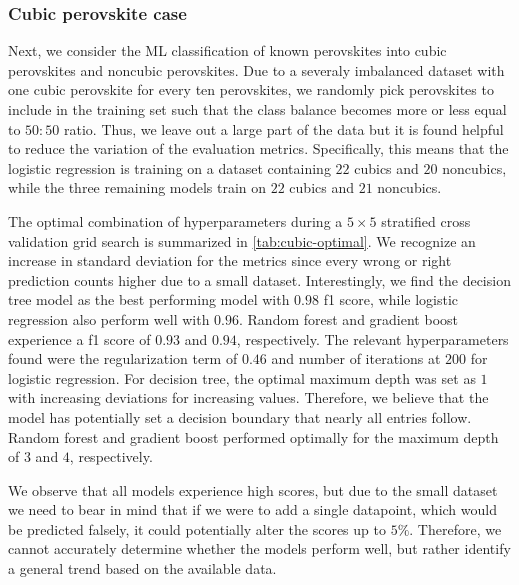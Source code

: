 \subsubsection{Cubic perovskite case}


Next, we consider the ML classification of known perovskites into cubic perovskites and noncubic perovskites. Due to a severaly imbalanced dataset with one cubic perovskite for every ten perovskites, we randomly pick perovskites to include in the training set such that the class balance becomes more or less equal to $50:50$ ratio. Thus, we leave out a large part of the data but it is found helpful to reduce the variation of the evaluation metrics. Specifically, this means that the logistic regression is training on a dataset containing $22$ cubics and $20$ noncubics, while the three remaining models train on $22$ cubics and $21$ noncubics.

The optimal combination of hyperparameters during a $5\times 5$ stratified cross validation grid search is summarized in \autoref{tab:cubic-optimal}. We recognize an increase in standard deviation for the metrics since every wrong or right prediction counts higher due to a small dataset. Interestingly, we find the decision tree model as the best performing model with $0.98$ f1 score, while logistic regression also perform well with $0.96$. Random forest and gradient boost experience a f1 score of $0.93$ and $0.94$, respectively. The relevant hyperparameters found were the regularization term of $0.46$ and number of iterations at $200$ for logistic regression. For decision tree, the optimal maximum depth was set as $1$ with increasing deviations for increasing values. Therefore, we believe that the model has potentially set a decision boundary that nearly all entries follow. Random forest and gradient boost performed optimally for the maximum depth of $3$ and $4$, respectively.

We observe that all models experience high scores, but due to the small dataset we need to bear in mind that if we were to add a single datapoint, which would be predicted falsely, it could potentially alter the scores up to $5\%$. Therefore, we cannot accurately determine whether the models perform well, but rather identify a general trend based on the available data.


